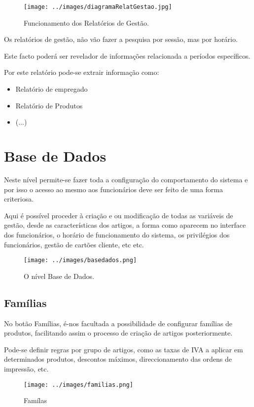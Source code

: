 \documentclass[a4paper,11pt,openany]{memoir}
\begin{document}
\begin{figure}
\texttt{[image: ../images/diagramaRelatGestao.jpg]}
\caption[Submanifold]{Funcionamento dos Relatórios de Gestão.}
\end{figure}

Os relatórios de gestão, não vão fazer a pesquisa por sessão, mas por horário.

Este facto poderá ser revelador de informações relacionada a períodos específicos.

Por este relatório pode-se extrair informação como:
\begin{itemize}
\item Relatório de empregado
\item Relatório de Produtos
\item (...)
\end{itemize}


\chapter{Base de Dados}

Neste nível permite-se fazer toda a configuração do comportamento do sistema e por isso o acesso
ao mesmo aos funcionários deve ser feito de uma forma criteriosa.

Aqui é possível proceder à criação e ou modificação de todas as variáveis de gestão, desde as 
características dos artigos, a forma como aparecem no interface dos funcionários, o horário
de funcionamento do sistema, os privilégios dos funcionários, gestão de cartões cliente, etc etc.
\nopagebreak
\begin{figure}
\texttt{[image: ../images/basedados.png]}
\caption[Submanifold]{O nível Base de Dados.}
\end{figure}

\newpage
\section{Famílias}

No botão Famílias, é-nos facultada a possibilidade de configurar famílias de produtos,
facilitando assim o processo de criação de artigos posteriormente.


Pode-se definir regras por grupo de artigos, como as taxas de IVA a aplicar 
em determinados produtos, descontos máximos, direccionamento das ordens de impressão, etc.


\begin{figure}
\texttt{[image: ../images/familias.png]}
\caption[Submanifold]{Famílas}
\end{figure}
\end{document}
